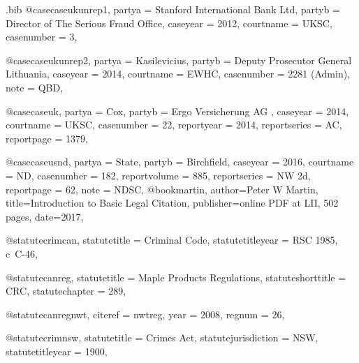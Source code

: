 \begin{filecontents*}[overwrite]{\jobname.bib}
@case{caseukunrep1,
  partya = {Stanford International Bank Ltd}, 
  partyb = {Director of The Serious Fraud Office},
  caseyear = {2012},
  courtname = {UKSC},
  casenumber = {3},
	}

@case{caseukunrep2,
  partya = {Kasilevicius}, 
  partyb = {Deputy Prosecutor General Lithuania},
  caseyear = {2014},
  courtname = {EWHC},
  casenumber = {2281 (Admin)},
	note = {QBD},
	}



@case{caseuk,
  partya = {Cox}, 
  partyb = {Ergo Versicherung AG },
  caseyear = {2014},
  courtname = {UKSC},
  casenumber = {22},
  reportyear = {2014},
  reportseries = {AC},
  reportpage = {1379},
	}



@case{caseusnd,
  partya = {State}, 
  partyb = {Birchfield},
  caseyear = {2016},
  courtname = {ND},
  casenumber = {182},
  reportvolume = {885},
  reportseries = {NW 2d},
  reportpage = {62},
  note = {NDSC},
	}
@book{martin,
author={Peter W Martin},
title={Introduction to Basic Legal Citation},
publisher={online PDF at LII, 502 pages},
date={2017},
}


@statute{crimcan,
statutetitle = {Criminal Code},
statutetitleyear = {RSC 1985, c~C-46},%
}


@statute{canreg,
statutetitle = {Maple Products Regulations},
statuteshorttitle = {CRC},
statutechapter = {289},
}

@statute{canregnwt,
citeref = {nwtreg},
year = {2008},
regnum = {26},
}


@statute{crimnsw,
statutetitle = {Crimes Act},
statutejurisdiction = {NSW},
statutetitleyear = {1900},%
}


\end{filecontents*}

